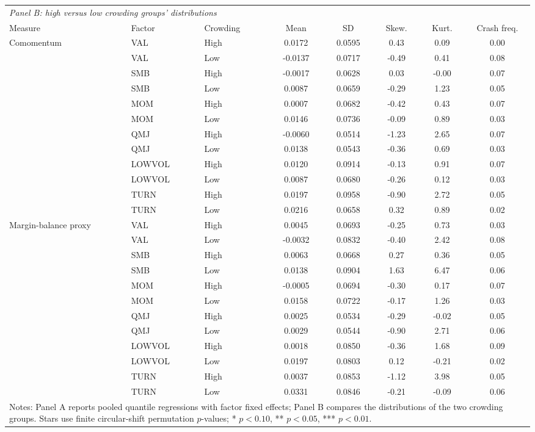 \begin{tabular}{lllccccc}
\toprule
\multicolumn{8}{l}{\textit{Panel B: high versus low crowding groups' distributions}} \\
Measure & Factor & Crowding & Mean & SD & Skew. & Kurt. & Crash freq. \\
\midrule
Comomentum & VAL & High & 0.0172 & 0.0595 & 0.43 & 0.09 & 0.00 \\
 & VAL & Low & -0.0137 & 0.0717 & -0.49 & 0.41 & 0.08 \\
 & SMB & High & -0.0017 & 0.0628 & 0.03 & -0.00 & 0.07 \\
 & SMB & Low & 0.0087 & 0.0659 & -0.29 & 1.23 & 0.05 \\
 & MOM & High & 0.0007 & 0.0682 & -0.42 & 0.43 & 0.07 \\
 & MOM & Low & 0.0146 & 0.0736 & -0.09 & 0.89 & 0.03 \\
 & QMJ & High & -0.0060 & 0.0514 & -1.23 & 2.65 & 0.07 \\
 & QMJ & Low & 0.0138 & 0.0543 & -0.36 & 0.69 & 0.03 \\
 & LOWVOL & High & 0.0120 & 0.0914 & -0.13 & 0.91 & 0.07 \\
 & LOWVOL & Low & 0.0087 & 0.0680 & -0.26 & 0.12 & 0.03 \\
 & TURN & High & 0.0197 & 0.0958 & -0.90 & 2.72 & 0.05 \\
 & TURN & Low & 0.0216 & 0.0658 & 0.32 & 0.89 & 0.02 \\
\midrule
Margin-balance proxy & VAL & High & 0.0045 & 0.0693 & -0.25 & 0.73 & 0.03 \\
 & VAL & Low & -0.0032 & 0.0832 & -0.40 & 2.42 & 0.08 \\
 & SMB & High & 0.0063 & 0.0668 & 0.27 & 0.36 & 0.05 \\
 & SMB & Low & 0.0138 & 0.0904 & 1.63 & 6.47 & 0.06 \\
 & MOM & High & -0.0005 & 0.0694 & -0.30 & 0.17 & 0.07 \\
 & MOM & Low & 0.0158 & 0.0722 & -0.17 & 1.26 & 0.03 \\
 & QMJ & High & 0.0025 & 0.0534 & -0.29 & -0.02 & 0.05 \\
 & QMJ & Low & 0.0029 & 0.0544 & -0.90 & 2.71 & 0.06 \\
 & LOWVOL & High & 0.0018 & 0.0850 & -0.36 & 1.68 & 0.09 \\
 & LOWVOL & Low & 0.0197 & 0.0803 & 0.12 & -0.21 & 0.02 \\
 & TURN & High & 0.0037 & 0.0853 & -1.12 & 3.98 & 0.05 \\
 & TURN & Low & 0.0331 & 0.0846 & -0.21 & -0.09 & 0.06 \\
\multicolumn{8}{l}{\parbox{\dimexpr\textwidth-10pt\relax}{\footnotesize Notes: Panel A reports pooled quantile regressions with factor fixed effects; Panel B compares the distributions of the two crowding groups. Stars use finite circular-shift permutation $p$-values; * $p<0.10$, ** $p<0.05$, *** $p<0.01$.}} \\
\bottomrule
\end{tabular}
\endgroup